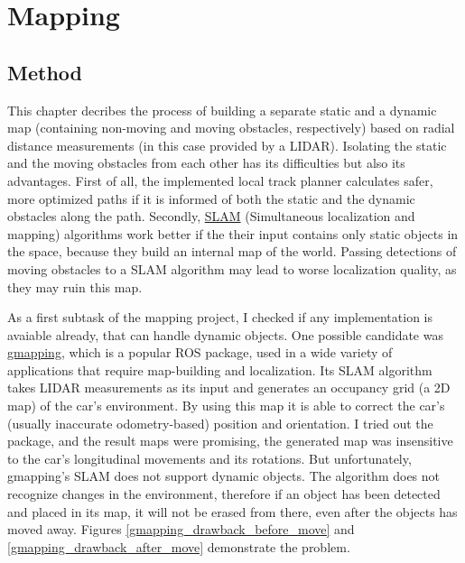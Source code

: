 \chapter{Mapping}
\section{Method}

This chapter decribes the process of building a separate static and a dynamic map (containing non-moving and moving obstacles, respectively) based on radial distance measurements (in this case provided by a LIDAR). Isolating the static and the moving obstacles from each other has its difficulties but also its advantages. First of all, the implemented local track planner calculates safer, more optimized paths if it is informed of both the static and the dynamic obstacles along the path. Secondly, \href{https://en.wikipedia.org/wiki/Simultaneous_localization_and_mapping}{SLAM} (Simultaneous localization and mapping) algorithms work better if the their input contains only static objects in the space, because they build an internal map of the world. Passing detections of moving obstacles to a SLAM algorithm may lead to worse localization quality, as they may ruin this map.

As a first subtask of the mapping project, I checked if any implementation is avaiable already, that can handle dynamic objects. One possible candidate was \href{http://wiki.ros.org/gmapping}{gmapping}, which is a popular ROS package, used in a wide variety of applications that require map-building and localization. Its SLAM algorithm takes LIDAR measurements as its input and generates an occupancy grid (a 2D map) of the car's environment. By using this map it is able to correct the car's (usually inaccurate odometry-based) position and orientation. I tried out the package, and the result maps were promising, the generated map was insensitive to the car's longitudinal movements and its rotations. But unfortunately, gmapping's SLAM does not support dynamic objects. The algorithm does not recognize changes in the environment, therefore if an object has been detected and placed in its map, it will not be erased from there, even after the objects has moved away. Figures \ref{gmapping_drawback_before_move} and \ref{gmapping_drawback_after_move} demonstrate the problem.

